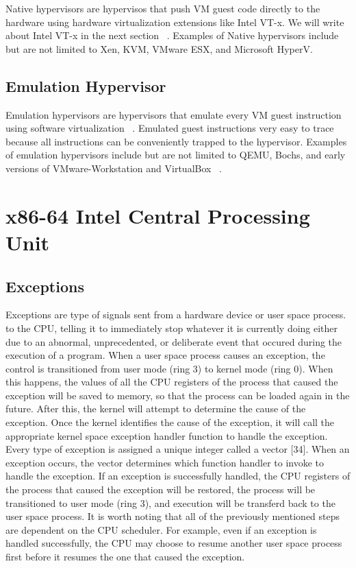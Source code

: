 \documentclass{report}
\begin{document}
\begin{spacing}{1.5}
{\large
Native hypervisors are hypervisos that push VM guest code directly to the hardware using hardware virtualization extensions like Intel VT-x. We will write about Intel VT-x in the next section ~\cite{10.1145/2775111}. Examples of Native hypervisors include but are not limited to Xen, KVM, VMware ESX, and Microsoft HyperV.
\newline
}


\subsection{Emulation Hypervisor}
{\large
Emulation hypervisors are hypervisors that emulate every VM guest instruction using software virtualization ~\cite{10.1145/2775111}. Emulated guest instructions very easy to trace because all instructions can be conveniently trapped to the hypervisor. Examples of emulation hypervisors include but are not limited to  QEMU, Bochs, and early versions of VMware-Workstation and VirtualBox ~\cite{10.1145/2775111}.
\newline
}










\section{x86-64 Intel Central Processing Unit}


\subsection{Exceptions}
{\large
Exceptions are type of signals sent from a hardware device or user space process. to the CPU, telling it to immediately stop whatever it is currently doing either due to an abnormal, unprecedented, or deliberate event that occured during the execution of a program. When a user space process causes an exception, the control is transitioned from user mode (ring 3) to kernel mode (ring 0). When this happens, the values of all the CPU registers of the process that caused the exception will be saved to memory, so that the process can be loaded again in the future. After this, the kernel will attempt to determine the cause of the exception. Once the kernel identifies the cause of the exception, it will call the appropriate kernel space exception handler function to handle the exception. Every type of exception is assigned a unique integer called a vector [34]. When an exception occurs, the vector determines which function handler to invoke to handle the exception. If an exception is successfully handled, the CPU registers of the process that caused the exception will be restored, the process will be transitioned to user mode (ring 3), and execution will be transferd back to the user space process. It is worth noting that all of the previously mentioned steps are dependent on the CPU scheduler. For example, even if an exception is handled successfully, the CPU may choose to resume another user space process first before it resumes the one that caused the exception.
\newline
}


\end{spacing}
\end{document}
